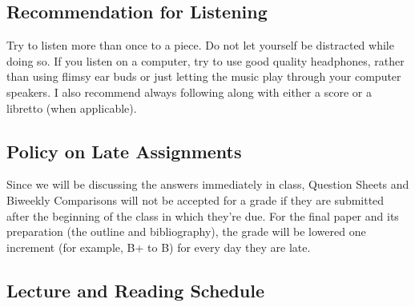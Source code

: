 \documentclass[letterpaper,10pt,english]{sphinxmanual}
\begin{document}
\subsection{Recommendation for Listening}
\label{syllabus:recommendation-for-listening}
Try to listen more than once to a piece. Do not let yourself be
distracted while doing so. If you listen on a computer, try to
use good quality headphones, rather than using flimsy ear
buds or just letting the music play through your computer
speakers. I also recommend always following along with
either a score or a libretto (when applicable).


\subsection{Policy on Late Assignments}
\label{syllabus:policy-on-late-assignments}
Since we will be discussing the answers immediately in
class, Question Sheets and Biweekly Comparisons will not
be accepted for a grade if they are submitted after the
beginning of the class in which they're due. For the final
paper and its preparation (the outline and bibliography),
the grade will be lowered one increment (for example, B+ to B)
for every day they are late.


\subsection{Lecture and Reading Schedule}
\label{syllabus:lecture-and-reading-schedule}
\end{document}
